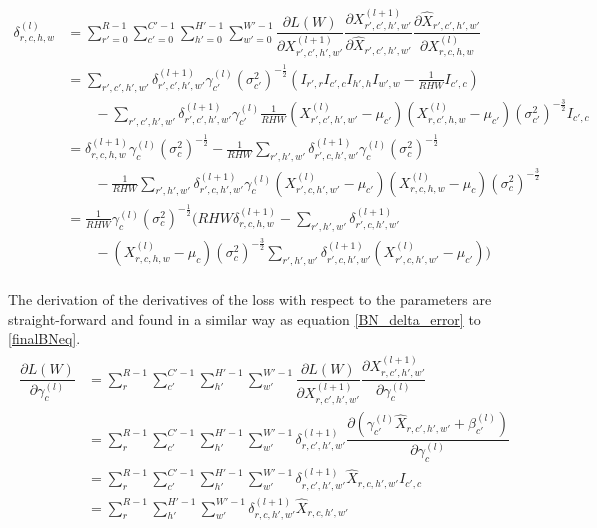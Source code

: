 \documentclass[a4paper,11pt,twoside]{article}
\newcommand*{\pd}[2]{\ensuremath{\dfrac{\partial #1}{\partial #2}}}
\begin{document}
\begin{equation}\label{finalBNeq}
\begin{split}
	\delta^{(l)}_{r,c,h,w} 
	& = \sum^{R-1}_{r'=0} \sum^{C'-1}_{c'=0} \sum^{H'-1}_{h'=0} \sum^{W'-1}_{w'=0} \pd{L(W)}{X^{(l+1)}_{r',c',h',w'}} \pd{X^{(l+1)}_{r',c',h',w'}}{\hat{X}_{r',c',h',w'}} \pd{\hat{X}_{r',c',h',w'}}{{X}^{(l)}_{r,c,h,w}}\\
	& = \sum\limits_{r',c',h',w'}\delta^{(l+1)}_{r',c',h',w'} \gamma^{(l)}_{c'} {(\sigma^2_{c'})}^{-\frac{1}{2}} (I_{r',r} I_{c',c} I_{h',h} I_{w',w} - \frac{1}{RHW} I_{c',c}) \\
	& \qquad -\sum\limits_{r',c',h',w'}\delta^{(l+1)}_{r',c',h',w'} \gamma^{(l)}_{c'} \frac{1}{RHW} ({X^{(l)}_{r',c',h',w'} - \mu_{c'}})({X^{(l)}_{r,c',h,w} - \mu_{c'}}) {(\sigma^2_{c'})}^{-\frac{3}{2}} I_{c',c} \\
	& = \delta^{(l+1)}_{r,c,h,w} \gamma^{(l)}_{c} {(\sigma^2_{c})}^{-\frac{1}{2}} - \frac{1}{RHW} \sum\limits_{r',h',w'} \delta^{(l+1)}_{r',c,h',w'} \gamma^{(l)}_{c} {(\sigma^2_{c})}^{-\frac{1}{2}}\\
	& \qquad - \frac{1}{RHW} \sum\limits_{r',h',w'} \delta^{(l+1)}_{r',c,h',w'}\gamma^{(l)}_{c} ({X^{(l)}_{r',c,h',w'} - \mu_{c'}})({X^{(l)}_{r,c,h,w} - \mu_{c}}){(\sigma^2_{c})}^{-\frac{3}{2}} \\
	& = \frac{1}{RHW} \gamma^{(l)}_c {(\sigma^2_{c})}^{-\frac{1}{2}} \biggl(    RHW \delta^{(l+1)}_{r,c,h,w} -  \sum\limits_{r',h',w'} \delta^{(l+1)}_{r',c,h',w'} \qquad \\
	& \qquad -  ({X^{(l)}_{r,c,h,w} - \mu_{c}}) {(\sigma^2_{c})}^{-\frac{3}{2}} \sum\limits_{r',h',w'} \delta^{(l+1)}_{r',c,h',w'} ({X^{(l)}_{r',c,h',w'} - \mu_{c'}}) \biggl) \\
\end{split}
\end{equation}

The derivation of the derivatives of the loss with respect to the parameters are straight-forward and found in a similar way as equation \eqref{BN_delta_error} to \eqref{finalBNeq}. \cite{webBN1} \cite{webBN2}
\begin{align}
\begin{split}
	\pd{L(W)}{\gamma^{(l)}_{c}}
		& = \sum^{R-1}_{r} \sum^{C'-1}_{c'} \sum^{H'-1}_{h'} \sum^{W'-1}_{w'} \pd{L(W)}{X^{(l+1)}_{r,c',h',w'}} \pd{X^{(l+1)}_{r,c',h',w'}}{\gamma^{(l)}_{c}} \\
		& = \sum^{R-1}_{r} \sum^{C'-1}_{c'} \sum^{H'-1}_{h'} \sum^{W'-1}_{w'} \delta^{(l+1)}_{r,c',h',w'}  \pd{({\gamma_{c'}^{(l)} \hat{X}_{r,c',h',w'} + \beta_{c'}^{(l)}})}{\gamma^{(l)}_{c}} \\
		& = \sum^{R-1}_{r} \sum^{C'-1}_{c'} \sum^{H'-1}_{h'} \sum^{W'-1}_{w'} \delta^{(l+1)}_{r,c',h',w'} \hat{X}_{r,c,h',w'} I_{c',c}\\
		& = \sum^{R-1}_{r} \sum^{H'-1}_{h'} \sum^{W'-1}_{w'} \delta^{(l+1)}_{r,c,h',w'} \hat{X}_{r,c,h',w'} \\
\end{split}
\end{align}
\end{document}
